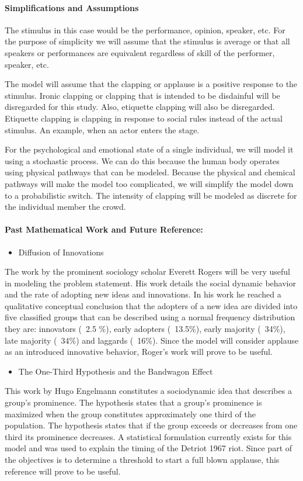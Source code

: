 \documentclass[12pt,letterpaper]{article}
\theoremstyle{definition}
\begin{document}
\paragraph {Simplifications and Assumptions}

The stimulus in this case would be the performance, opinion, speaker, etc. For the purpose of simplicity we will assume that the stimulus is average or that all speakers or performances are equivalent regardless of skill of the performer, speaker, etc.

The model will assume that the clapping or applause is a positive response to the stimulus. Ironic clapping or clapping that is intended to be disdainful will be disregarded for this study. Also, etiquette clapping will also be disregarded. Etiquette clapping is clapping in response to social rules instead of the actual stimulus. An example, when an actor enters the stage.

For the psychological and emotional state of a single individual, we will model it using a stochastic process. We can do this because the human body operates using physical pathways that can be modeled. Because the physical and chemical pathways will make the model too complicated, we will simplify the model down to a probabilistic switch. The intensity of clapping will be modeled as discrete for the individual member the crowd. 

\paragraph{Past Mathematical Work and Future Reference:}
	\begin{itemize}
		\item Diffusion of Innovations 
	\end{itemize}
The work by the prominent sociology scholar Everett Rogers will be very useful in modeling the problem statement. His work details the social dynamic behavior and the rate of adopting new ideas and innovations. In his work he reached a qualitative conceptual conclusion that the adopters of a new idea are divided into five classified groups that can be described using a normal frequency distribution they are: innovators (~2.5 \%), early adopters (~13.5\%), early majority (~34\%), late majority (~34\%) and laggards (~16\%).    Since the model will consider applause as an introduced innovative behavior, Roger’s work will prove to be useful.
	\begin{itemize}
	\item The One-Third Hypothesis and the Bandwagon Effect 
		\end{itemize}
This work by Hugo Engelmann constitutes a sociodynamic idea that describes a group’s prominence. The hypothesis states that a group’s prominence is maximized when the group constitutes approximately one third of the population. The hypothesis states that if the group exceeds or decreases from one third its prominence decreases. A statistical formulation currently exists for this model and was used to explain the timing of the Detriot 1967 riot. Since part of the objectives is to determine a threshold to start a full blown applause, this reference will prove to be useful.
\end{document}
